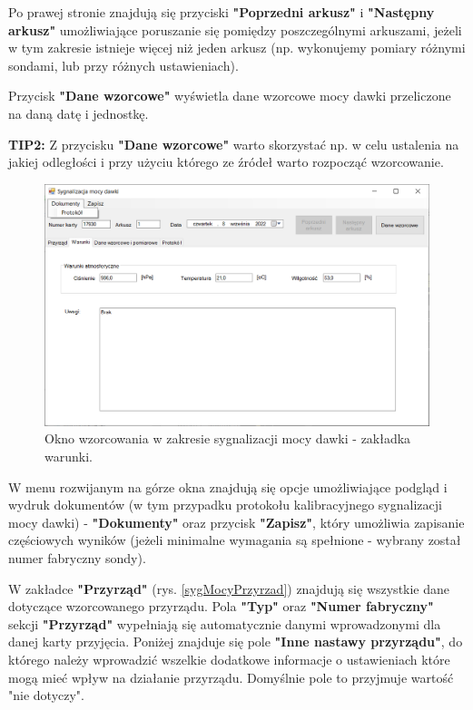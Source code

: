 {{	Po prawej stronie znajdują się przyciski \textbf{"Poprzedni arkusz"} i \textbf{"Następny arkusz"} umożliwiające poruszanie się pomiędzy poszczególnymi arkuszami, jeżeli w tym zakresie istnieje więcej niż jeden arkusz (np. wykonujemy pomiary różnymi sondami, lub przy różnych ustawieniach).
	
	Przycisk \textbf{"Dane wzorcowe"} wyświetla dane wzorcowe mocy dawki przeliczone na daną datę i jednostkę.
	
	\textbf{TIP2:} Z przycisku \textbf{"Dane wzorcowe"} warto skorzystać np. w celu ustalenia na jakiej odległości i przy użyciu którego ze źródeł warto rozpocząć wzorcowanie.
	
	\begin{figure}[htb]
	\centering
	\includegraphics[width=\columnwidth]{obrazki/Wzorcowanie/syg_mocy_dawki/warunki.png}
	\caption{Okno wzorcowania w zakresie sygnalizacji mocy dawki - zakładka warunki.}
	\label{sygMocyWarunki}
	\end{figure}
	
	W menu rozwijanym na górze okna znajdują się opcje umożliwiające podgląd i wydruk dokumentów (w tym przypadku protokołu kalibracyjnego sygnalizacji mocy dawki) - \textbf{"Dokumenty"} oraz przycisk \textbf{"Zapisz"}, który umożliwia zapisanie częściowych wyników (jeżeli minimalne wymagania są spełnione - wybrany został numer fabryczny sondy).
	
	W zakładce \textbf{"Przyrząd"} (rys. \ref{sygMocyPrzyrzad}) znajdują się wszystkie dane dotyczące wzorcowanego przyrządu. Pola \textbf{"Typ"} oraz \textbf{"Numer fabryczny"} sekcji \textbf{"Przyrząd"} wypełniają się automatycznie danymi wprowadzonymi dla danej karty przyjęcia. Poniżej znajduje się pole \textbf{"Inne nastawy przyrządu"}, do którego należy wprowadzić wszelkie dodatkowe informacje o ustawieniach które mogą mieć wpływ na działanie przyrządu. Domyślnie pole to przyjmuje wartość "nie dotyczy".
	
}}
